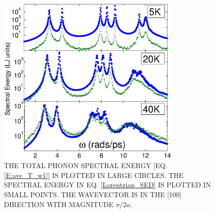 \documentclass[twocolumn,10pt]{asme2e}
\begin{document}
\begin{figure}
\begin{center}
\includegraphics[angle=0,width=90.0mm]{LJ_NMD_SED_PEAK_COMPARE.eps}
\end{center}
\caption{\label{F:PEAK_COMPARE} THE TOTAL PHONON SPECTRAL ENERGY [EQ$.$ \eqref{E:ave_T_w1}] IS PLOTTED IN LARGE CIRCLES.  THE SPECTRAL ENERGY IN EQ$.$ \eqref{Lorentzian_SED} IS PLOTTED IN SMALL POINTS. THE WAVEVECTOR IS IN THE [100] DIRECTION WITH MAGNITUDE $\pi/2a$.}
\vspace*{-5mm}
\end{figure}
\end{document}
